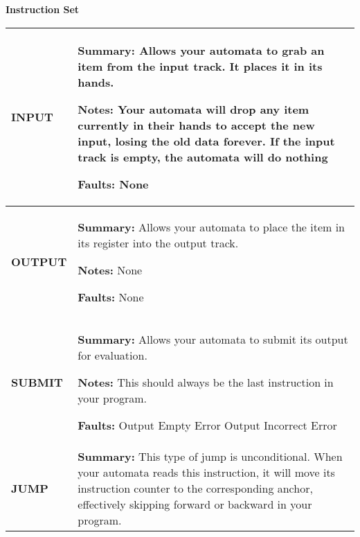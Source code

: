 \textbf{Instruction Set}
\begin{center}
    \begin{tabular}{ | m{3cm} | m{11cm} | } 
        \hline
            \begin{center}
                \textbf{INPUT} 
            \end{center}& 
            \textbf{Summary:} 
            \newline Allows your automata to grab an item from the input track. It places it in its hands.

            \textbf{Notes:} 
            \newline Your automata will drop any item currently in their hands to accept the new input, losing the old data forever.
            \newline If the input track is empty, the automata will do nothing

            \textbf{Faults:}
            \newline None\\
        \hline
            \begin{center}
                \textbf{OUTPUT} 
            \end{center}& 
            \textbf{Summary:} 
            \newline Allows your automata to place the item in its register into the output track.

            \textbf{Notes:} 
            \newline None

            \textbf{Faults:}
            \newline None\\
        \hline
            \begin{center}
                \textbf{SUBMIT} 
            \end{center}& 
            \textbf{Summary:} 
            \newline Allows your automata to submit its output for evaluation.

            \textbf{Notes:} 
            \newline This should always be the last instruction in your program.

            \textbf{Faults:}
            \newline Output Empty Error
            \newline Output Incorrect Error\\ 
        \hline
            \begin{center}
                \textbf{JUMP} 
            \end{center}& 
            \textbf{Summary:} 
            \newline This type of jump is unconditional. When your automata reads this instruction, it will move its instruction 
            counter to the corresponding anchor, effectively skipping forward or backward in your program.


\end{tabular}
\end{center}
